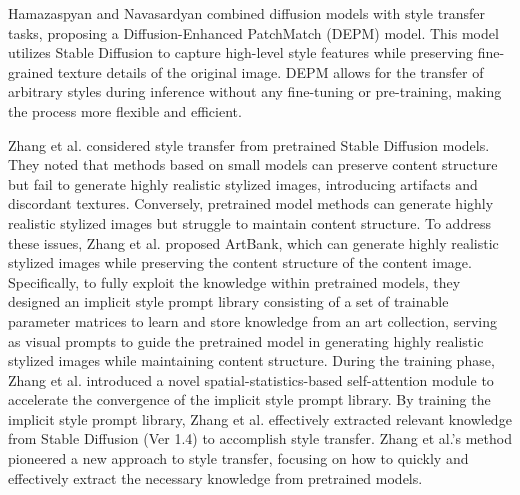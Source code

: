 Hamazaspyan and Navasardyan\citep{59hamazaspyan2023diffusion} combined diffusion models with style transfer tasks, proposing a Diffusion-Enhanced PatchMatch (DEPM) model. This model utilizes Stable Diffusion to capture high-level style features while preserving fine-grained texture details of the original image. DEPM allows for the transfer of arbitrary styles during inference without any fine-tuning or pre-training, making the process more flexible and efficient.

Zhang et al.\citep{60zhang2024artbank} considered style transfer from pretrained Stable Diffusion models\citep{61rombach2022high}. They noted that methods based on small models can preserve content structure but fail to generate highly realistic stylized images, introducing artifacts and discordant textures. Conversely, pretrained model methods can generate highly realistic stylized images but struggle to maintain content structure. To address these issues, Zhang et al. proposed ArtBank, which can generate highly realistic stylized images while preserving the content structure of the content image. Specifically, to fully exploit the knowledge within pretrained models, they designed an implicit style prompt library consisting of a set of trainable parameter matrices to learn and store knowledge from an art collection, serving as visual prompts to guide the pretrained model in generating highly realistic stylized images while maintaining content structure. During the training phase, Zhang et al. introduced a novel spatial-statistics-based self-attention module to accelerate the convergence of the implicit style prompt library. By training the implicit style prompt library, Zhang et al. effectively extracted relevant knowledge from Stable Diffusion (Ver 1.4) to accomplish style transfer. Zhang et al.'s method pioneered a new approach to style transfer, focusing on how to quickly and effectively extract the necessary knowledge from pretrained models.

